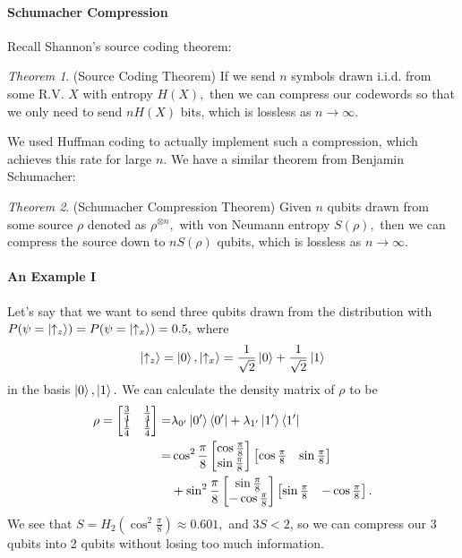 \documentclass[12pt]{article}
\theoremstyle{remark}
\newtheorem*{theorem}{Theorem}
\begin{document}
\paragraph{Schumacher Compression}
Recall Shannon's source coding theorem:
\begin{theorem} (Source Coding Theorem)
If we send $n$ symbols drawn i.i.d. from some R.V. $X$ with entropy $H(X),$ then we can compress our codewords so that we only need to send $nH(X)$ bits, which is lossless as $n\to \infty.$
\end{theorem}
We used Huffman coding to actually implement such a compression, which achieves this rate for large $n.$ We have a similar theorem from Benjamin Schumacher:
\begin{theorem} (Schumacher Compression Theorem)
    Given $n$ qubits drawn from some source $\rho$ denoted as $\rho^{\otimes n},$ with von Neumann entropy $S(\rho),$ then we can compress the source down to $nS(\rho)$ qubits, which is lossless as $n\to\infty.$
\end{theorem}

\paragraph{An Example I}
Let's say that we want to send three qubits drawn from the distribution with $P(\psi=\ket{\uparrow_z})=P(\psi=\ket{\uparrow_x})=0.5,$ where
\[\ket{\uparrow_z}=\ket{0},\ket{\uparrow_x}=\frac{1}{\sqrt{2}}\ket{0}+\frac{1}{\sqrt{2}}\ket{1}\] in the basis $\ket{0},\ket{1}.$ We can calculate the density matrix of $\rho$ to be
\begin{align*}\rho=\begin{bmatrix}
    \frac34&\frac14\\\frac14&\frac14
\end{bmatrix}=&\lambda_{0'}\ket{0'}\bra{0'}+\lambda_{1'}\ket{1'}\bra{1'}\\=&\cos^2\frac{\pi}{8}\begin{bmatrix}
    \cos\frac\pi 8\\\sin\frac\pi 8
\end{bmatrix}\begin{bmatrix}
    \cos\frac\pi 8&\sin\frac\pi 8
\end{bmatrix}\\&+\sin^2\frac{\pi}{8}\begin{bmatrix}
    \sin\frac\pi 8\\-\cos\frac\pi 8
\end{bmatrix}\begin{bmatrix}
    \sin\frac\pi 8&-\cos\frac\pi 8
\end{bmatrix}.\end{align*}
We see that $S=H_2(\cos^2\frac\pi 8)\approx 0.601,$ and $3S<2$, so we can compress our 3 qubits into 2 qubits without losing too much information.
\end{document}
